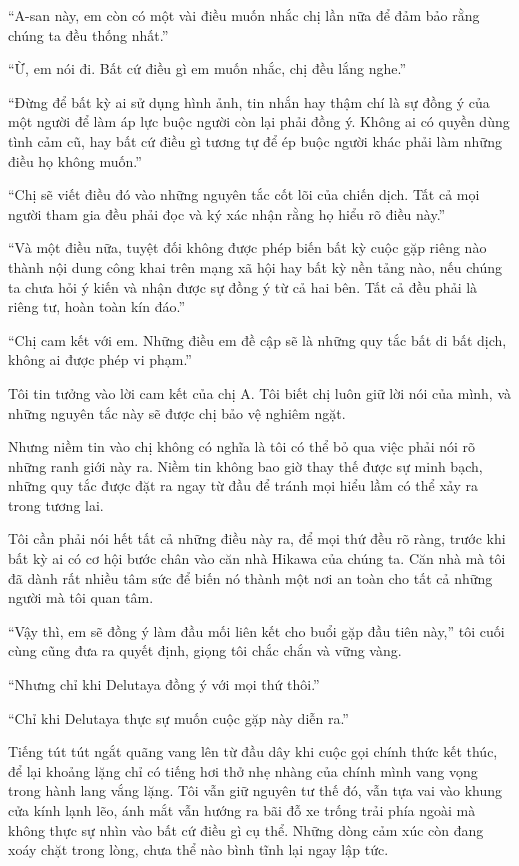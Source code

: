 \documentclass[../main.tex]{subfiles}
\begin{document}
``A-san này, em còn có một vài điều muốn nhắc chị lần nữa để đảm bảo rằng chúng ta đều thống nhất.''

``Ừ, em nói đi. Bất cứ điều gì em muốn nhắc, chị đều lắng nghe.''

``Đừng để bất kỳ ai sử dụng hình ảnh, tin nhắn hay thậm chí là sự đồng ý của một người để làm áp lực buộc người còn lại phải đồng ý. Không ai có quyền dùng tình cảm cũ, hay bất cứ điều gì tương tự để ép buộc người khác phải làm những điều họ không muốn.''

``Chị sẽ viết điều đó vào những nguyên tắc cốt lõi của chiến dịch. Tất cả mọi người tham gia đều phải đọc và ký xác nhận rằng họ hiểu rõ điều này.''

``Và một điều nữa, tuyệt đối không được phép biến bất kỳ cuộc gặp riêng nào thành nội dung công khai trên mạng xã hội hay bất kỳ nền tảng nào, nếu chúng ta chưa hỏi ý kiến và nhận được sự đồng ý từ cả hai bên. Tất cả đều phải là riêng tư, hoàn toàn kín đáo.''

``Chị cam kết với em. Những điều em đề cập sẽ là những quy tắc bất di bất dịch, không ai được phép vi phạm.''

Tôi tin tưởng vào lời cam kết của chị A. Tôi biết chị luôn giữ lời nói của mình, và những nguyên tắc này sẽ được chị bảo vệ nghiêm ngặt.

Nhưng niềm tin vào chị không có nghĩa là tôi có thể bỏ qua việc phải nói rõ những ranh giới này ra. Niềm tin không bao giờ thay thế được sự minh bạch, những quy tắc được đặt ra ngay từ đầu để tránh mọi hiểu lầm có thể xảy ra trong tương lai.

Tôi cần phải nói hết tất cả những điều này ra, để mọi thứ đều rõ ràng, trước khi bất kỳ ai có cơ hội bước chân vào căn nhà Hikawa của chúng ta. Căn nhà mà tôi đã dành rất nhiều tâm sức để biến nó thành một nơi an toàn cho tất cả những người mà tôi quan tâm.

``Vậy thì, em sẽ đồng ý làm đầu mối liên kết cho buổi gặp đầu tiên này,'' tôi cuối cùng cũng đưa ra quyết định, giọng tôi chắc chắn và vững vàng.

``Nhưng chỉ khi Delutaya đồng ý với mọi thứ thôi.''

``Chỉ khi Delutaya thực sự muốn cuộc gặp này diễn ra.''

Tiếng tút tút ngắt quãng vang lên từ đầu dây khi cuộc gọi chính thức kết thúc, để lại khoảng lặng chỉ có tiếng hơi thở nhẹ nhàng của chính mình vang vọng trong hành lang vắng lặng. Tôi vẫn giữ nguyên tư thế đó, vẫn tựa vai vào khung cửa kính lạnh lẽo, ánh mắt vẫn hướng ra bãi đỗ xe trống trải phía ngoài mà không thực sự nhìn vào bất cứ điều gì cụ thể. Những dòng cảm xúc còn đang xoáy chặt trong lòng, chưa thể nào bình tĩnh lại ngay lập tức.
\end{document}
